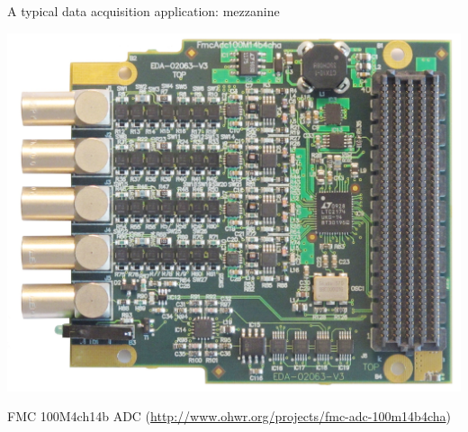 \documentclass[compress,red]{beamer}
\begin{document}
\begin{frame}{A typical data acquisition application: mezzanine}
\begin{center}
\includegraphics[rotate=180,height=0.65\textheight]{adc.jpg}
\end{center}
\centering
FMC 100M4ch14b ADC
(\url{http://www.ohwr.org/projects/fmc-adc-100m14b4cha})
\end{frame}
\end{document}
